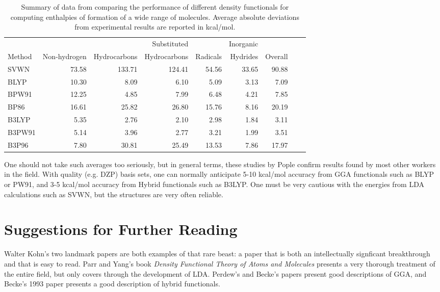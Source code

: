 \begin{table}
\caption{Summary of data from \cite{Curtiss96} comparing the
performance of different density functionals for computing enthalpies
of formation of a wide range of molecules. Average absolute deviations
from experimental results are reported in kcal/mol.}
\label{table:popdft}
\begin{tabular}{lrrrrrrrr}\hline\hline
       &              &              & Substituted &   & Inorganic & \\
Method & Non-hydrogen & Hydrocarbons & Hydrocarbons & Radicals &
	Hydrides & Overall \\ \hline
SVWN & 73.58 & 133.71 & 124.41 & 54.56 & 33.65 & 90.88\\
BLYP & 10.30 & 8.09 & 6.10 & 5.09 & 3.13 & 7.09 \\
BPW91 & 12.25 & 4.85 & 7.99 & 6.48 & 4.21 & 7.85 \\
BP86 & 16.61 & 25.82 & 26.80 & 15.76 & 8.16 & 20.19 \\
B3LYP & 5.35 & 2.76 & 2.10 & 2.98 & 1.84 & 3.11 \\
B3PW91 & 5.14 & 3.96 & 2.77 & 3.21 & 1.99 & 3.51 \\
B3P96 & 7.80 & 30.81 & 25.49 & 13.53 & 7.86 & 17.97 \\
\hline\hline
\end{tabular}
\end{table}

One should not take such averages too seriously, but in general terms,
these studies by Pople confirm results found by most other workers in
the field. With quality (e.g. DZP) basis sets, one can normally
anticipate 5-10 kcal/mol accuracy from GGA functionals such as BLYP or
PW91, and 3-5 kcal/mol accuracy from Hybrid functionals such as
B3LYP. One must be very cautious with the energies from LDA
calculations such as SVWN, but the structures are very often reliable.


\section{Suggestions for Further Reading}
Walter Kohn's two landmark papers \cite{Hohenberg64,Kohn65} are both
examples of that rare beast: a paper that is both an intellectually
signficant breakthrough and that is easy to read. Parr and Yang's book
\emph{Density Functional Theory of Atoms and Molecules} presents a
very thorough treatment of the entire field, but only covers through
the development of LDA. Perdew's \cite{Perdew86} and Becke's
\cite{Becke86, Becke88a, Becke88b} papers present good descriptions of
GGA, and Becke's 1993 paper \cite{Becke93} presents a good description
of hybrid functionals.
